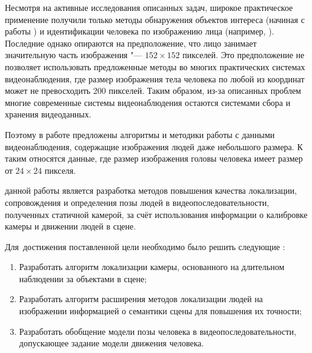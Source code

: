 Несмотря на активные исследования описанных задач, широкое практическое применение получили только методы обнаружения объектов интереса (начиная с работы \cite{viola2001rapid}) и идентификации человека по изображению лица (например, \cite{taigman2014deepface,schroff2015facenet}). Последние однако опираются на предположение, что лицо занимает значительную часть изображения "--- $152\times152$ пикселей. Это предположение не позволяет использовать предложенные методы во многих практических системах видеонаблюдения, где размер изображения тела человека по любой из координат может не превосходить 200 пикселей. Таким образом, из-за описанных проблем многие современные системы видеонаблюдения остаются системами сбора и хранения видеоданных.

Поэтому в работе предложены алгоритмы и методики работы с данными видеонаблюдения, содержащие изображения людей даже небольшого размера. К таким относятся данные, где размер изображения головы человека имеет размер от $24\times24$ пикселя.


{\aim} данной работы является разработка методов повышения качества локализации, сопровождения и определения позы людей в видеопоследовательности, полученных статичной камерой, за счёт использования информации о калибровке камеры и движении людей в сцене.

Для~достижения поставленной цели необходимо было решить следующие {\tasks}:
\begin{enumerate}
  \item Разработать алгоритм локализации камеры, основанного на длительном наблюдении за объектами в сцене;
  \item Разработать алгоритм расширения методов локализации людей на изображении информацией о семантики сцены для повышения их точности;
  \item Разработать обобщение модели позы человека в видеопоследовательности, допускающее задание модели движения человека.
\end{enumerate}


